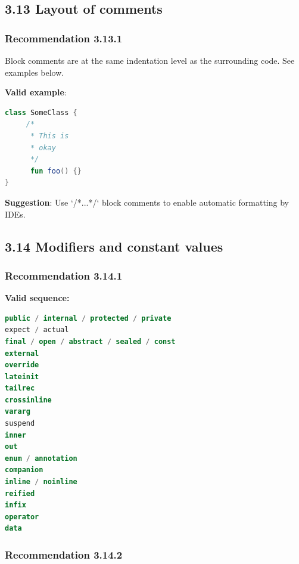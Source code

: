 {{{{\subsection*{\textbf{3.13 Layout of comments}}

\subsubsection*{\textbf{Recommendation 3.13.1}}
\leavevmode\newline



Block comments are at the same indentation level as the surrounding code. See examples below.



\textbf{Valid example}:



\begin{lstlisting}[language=Kotlin]
class SomeClass {
     /*
      * This is
      * okay
      */
      fun foo() {}
}
\end{lstlisting}


\textbf{Suggestion}: Use `/*...*/` block comments to enable automatic formatting by IDEs.



\subsection*{\textbf{3.14 Modifiers and constant values}}

\subsubsection*{\textbf{Recommendation 3.14.1}}
\leavevmode\newline

\textbf{Valid sequence:}



\begin{lstlisting}[language=Kotlin]
public / internal / protected / private
expect / actual
final / open / abstract / sealed / const
external
override
lateinit
tailrec
crossinline
vararg
suspend
inner
out
enum / annotation
companion
inline / noinline
reified
infix
operator
data
\end{lstlisting}


\subsubsection*{\textbf{Recommendation 3.14.2}}
\leavevmode\newline



}}}}
